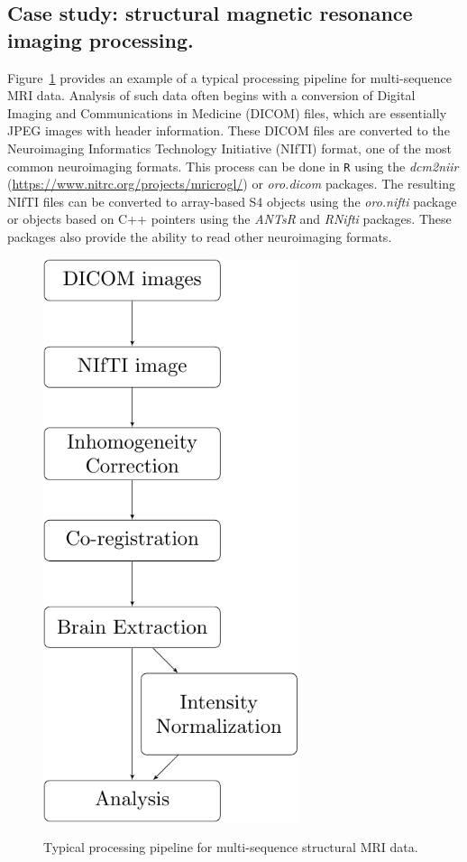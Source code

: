 \documentclass[]{elsarticle} %
\newcommand{\pkg}[1]{\emph{#1}}
\begin{document}
\subsection{Case study: structural magnetic resonance imaging processing.} Figure~\ref{fig:flow} provides an example of a typical processing pipeline for multi-sequence MRI data. Analysis of such data often begins with a conversion of Digital Imaging and Communications in Medicine (DICOM) files, which are essentially JPEG images with header information.  These DICOM files are converted to the Neuroimaging Informatics Technology Initiative (NIfTI) format, one of the most common neuroimaging formats. This process can be done in \verb"R" using the \pkg{dcm2niir} (\url{https://www.nitrc.org/projects/mricrogl/}) or \pkg{oro.dicom} \cite{dicom_nifti} packages. The resulting NIfTI files can be converted to array-based S4 objects  using the \pkg{oro.nifti} \cite{oro.nifti} package or objects based on C++ pointers using the \pkg{ANTsR} \cite{antsr} and \pkg{RNifti} \cite{Rnifti} packages.  These packages also provide the ability to read other neuroimaging formats.
 
\begin{figure}[!ht]
  \begin{center}
    \caption{Typical processing pipeline for multi-sequence structural MRI data.}
    \includegraphics[height=6.5in]{Imaging_Pipeline_Flowchart.pdf}
    \label{fig:flow}
  \end{center}
\end{figure}
\end{document}
